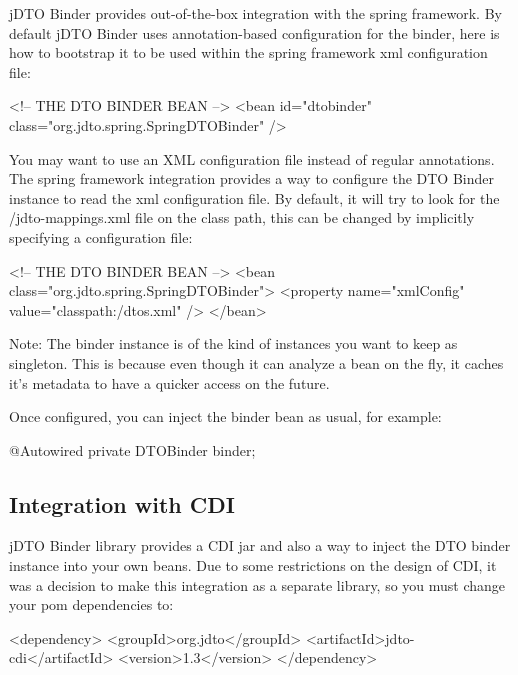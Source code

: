 \documentclass[11pt]{article}
\newcommand{\JDTO}{jDTO Binder\xspace}
\newcommand{\DEFAULTCONFIG}{/jdto-mappings.xml\xspace}
\begin{document}
\JDTO provides out-of-the-box integration with the spring framework. By default \JDTO uses annotation-based configuration for the binder, here is how to bootstrap it to be used within the spring framework xml configuration file:


\begin{xml}
<!-- THE DTO BINDER BEAN --> 
<bean id="dtobinder" 
    class="org.jdto.spring.SpringDTOBinder" />
\end{xml}


You may want to use an XML configuration file instead of regular annotations. The spring framework integration
provides a way to configure the DTO Binder instance to read the xml configuration file. By default, it will try to look for the \DEFAULTCONFIG file on the class path, this can be changed by implicitly specifying a configuration file:


\begin{xml}
<!-- THE DTO BINDER BEAN --> 
<bean class="org.jdto.spring.SpringDTOBinder">
    <property name="xmlConfig" value="classpath:/dtos.xml" />
</bean>
\end{xml}


Note: The binder instance is of the kind of instances you want to keep as singleton. This is because even though it can analyze a bean on the fly, it caches it's metadata to have a quicker access on the future.

Once configured, you can inject the binder bean as usual, for example:


\begin{java}
@Autowired
private DTOBinder binder;
\end{java}

\subsection{Integration with CDI}

\JDTO library provides a CDI jar and also a way to inject the DTO binder instance into your own beans. Due to some restrictions on the design of CDI, it was a decision to make this integration as a separate library, so you must change your pom dependencies to:


\begin{xml}
    <dependency>
        <groupId>org.jdto</groupId>
        <artifactId>jdto-cdi</artifactId>
        <version>1.3</version>
    </dependency>
\end{xml}
\end{document}
